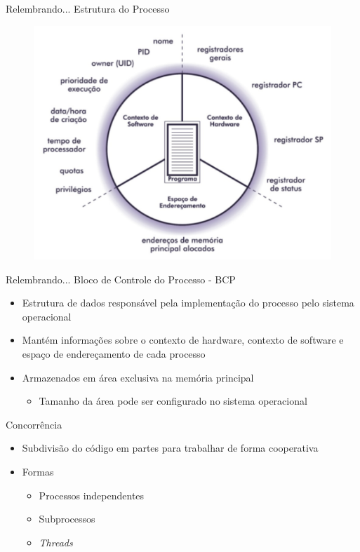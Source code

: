 \documentclass[aspectratio=169,
				xcolor=table]{beamer}
\begin{document}
	\begin{frame}{Relembrando...}	
		\alert{\Large Estrutura do Processo}
		\begin{figure}[hbtp]
			\centering
			\includegraphics[keepaspectratio, height=.7\textheight]{../figs/cap04/estrutura1.png}
		\end{figure}
	\end{frame}
	
	\begin{frame}{Relembrando...}
		\alert{\Large Bloco de Controle do Processo - BCP}
		\vspace{1em}
		\begin{itemize}
			\item Estrutura de dados responsável pela implementação do processo pelo sistema operacional
			\vspace{1em}
			\item Mantém informações sobre o contexto de hardware, contexto de software e espaço de endereçamento de cada processo
			\vspace{1em}
			\item Armazenados em área exclusiva na memória principal
			\begin{itemize}
				\item Tamanho da área pode ser configurado no sistema operacional
			\end{itemize}
		\end{itemize}
	\end{frame}
	
	\begin{frame}{Concorrência}
		\begin{itemize}
			\item Subdivisão do código em partes para trabalhar de forma cooperativa
			\vspace{1em}
			\item Formas
			\begin{itemize}
				\item Processos independentes
				\item Subprocessos
				\item \textit{Threads}
			\end{itemize}
		\end{itemize}		
	\end{frame}
	
\end{document}
